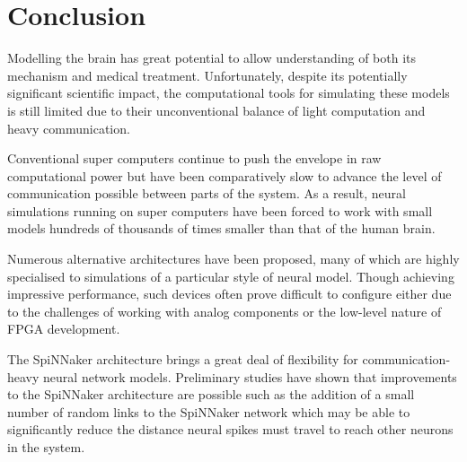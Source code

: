 \chapter{Conclusion}
	
	
	Modelling the brain has great potential to allow understanding of both its
	mechanism and medical treatment. Unfortunately, despite its potentially
	significant scientific impact, the computational tools for simulating these
	models is still limited due to their unconventional balance of light
	computation and heavy communication.
	
	
	Conventional super computers continue to push the envelope in raw
	computational power but have been comparatively slow to advance the level of
	communication possible between parts of the system. As a result, neural
	simulations running on super computers have been forced to work with small
	models hundreds of thousands of times smaller than that of the human brain.
	
	Numerous alternative architectures have been proposed, many of which are
	highly specialised to simulations of a particular style of neural model.
	Though achieving impressive performance, such devices often prove difficult to
	configure either due to the challenges of working with analog components or
	the low-level nature of FPGA development.
	
	
	The SpiNNaker architecture brings a great deal of flexibility for
	communication-heavy neural network models. Preliminary studies have shown that
	improvements to the SpiNNaker architecture are possible such as the addition
	of a small number of random links to the SpiNNaker network which may be able
	to significantly reduce the distance neural spikes must travel to reach other
	neurons in the system.
	
